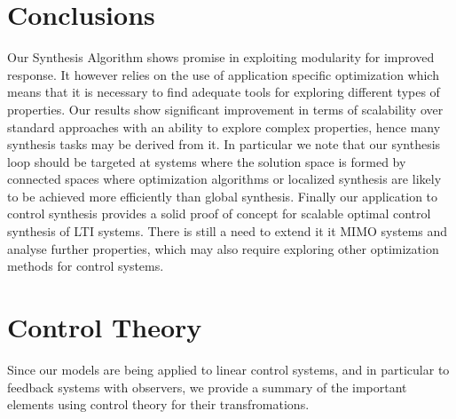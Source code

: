 \documentclass[sigconf]{llncs}
\begin{document}
\section{Conclusions}
\label{sec:conclusions}

Our Synthesis Algorithm shows promise in exploiting modularity for
improved response. It however relies on the use of application
specific optimization which means that it is necessary to find adequate tools for
exploring different types of properties.  Our results show significant
improvement in terms of scalability over standard approaches with an ability to
explore complex properties, hence many synthesis tasks may be derived
from it. In particular we note that our synthesis loop should be targeted at
systems where the solution space is formed by connected spaces where
optimization algorithms or localized synthesis are likely to be achieved more
efficiently than global synthesis.
Finally our application to control synthesis provides a solid proof
of concept for scalable optimal control synthesis of LTI systems. There is still
a need to extend it it MIMO systems and analyse further properties, which may
also require exploring other optimization methods for control systems.

\newpage


\newpage
\appendix

\section{Control Theory} \label{sec:control_theory}

Since our models are being applied to linear control systems, and in particular to feedback systems with observers,
we provide a summary of the important elements using control theory for their transfromations.
\end{document}
